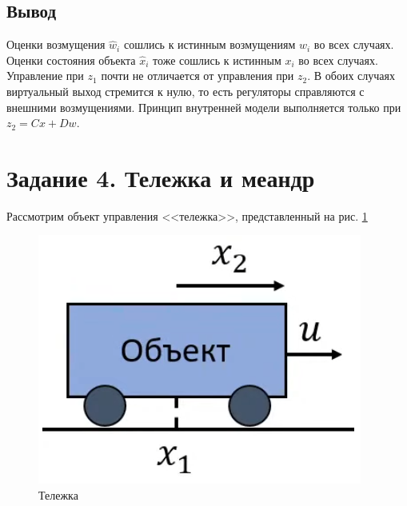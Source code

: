 \documentclass[a4paper, 12pt]{article}
\begin{document}
    \subsection{Вывод}
    Оценки возмущения $\hat{w}_i$ сошлись к истинным возмущениям $w_i$ во всех случаях.
    Оценки состояния объекта $\hat{x}_i$ тоже сошлись к истинным $x_i$ во всех случаях.
    Управление при $z_1$ почти не отличается от управления при $z_2$. В обоих случаях
    виртуальный выход стремится к нулю, то есть регуляторы справляются с внешними
    возмущениями. Принцип внутренней модели выполняется только при $z_2=Cx+Dw$.


    \section{Задание 4. Тележка и меандр}
    Рассмотрим объект управления <<тележка>>, представленный на рис. \ref{fig:4task_obj}
    \begin{figure}[H]
        \centering
        \includegraphics[scale=0.55]{4task_obj.png}
        \captionsetup{skip=0pt}
        \caption{Тележка}
        \label{fig:4task_obj}
    \end{figure}
\end{document}
